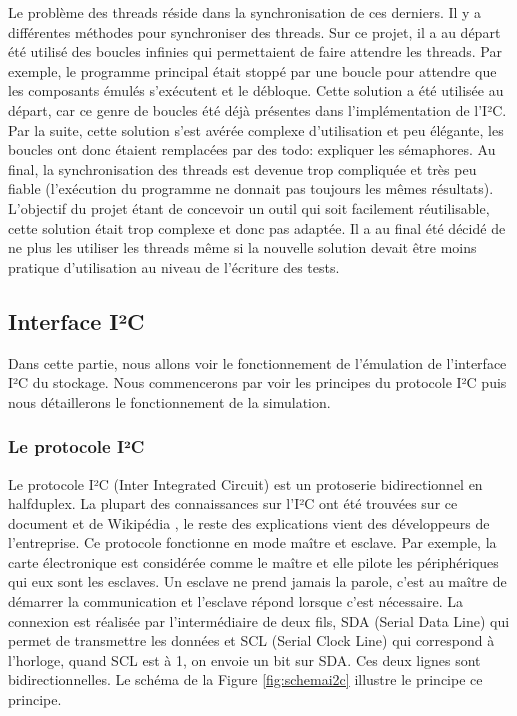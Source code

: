 \documentclass[a4paper]{article}
\begin{document}
Le problème des threads réside dans la synchronisation de ces derniers. Il y a
différentes méthodes pour synchroniser des threads. Sur ce projet, il a au
départ été utilisé des boucles infinies qui permettaient de faire attendre les
threads. Par exemple, le programme principal était stoppé par une boucle pour
attendre que les composants émulés s'exécutent et le débloque. Cette solution a
été utilisée au départ, car ce genre de boucles été déjà présentes dans
l'implémentation de l'I²C. Par la suite, cette solution s'est avérée complexe
d'utilisation et peu élégante, les boucles ont donc étaient remplacées par des %
todo: expliquer les sémaphores. Au final, la synchronisation des threads est
devenue trop compliquée et très peu fiable (l'exécution du programme ne donnait
pas toujours les mêmes résultats). L'objectif du projet étant de concevoir un
outil qui soit facilement réutilisable, cette solution était trop complexe et
donc pas adaptée. Il a au final été décidé de ne plus les utiliser les threads
même si la nouvelle solution devait être moins pratique d'utilisation au niveau
de l'écriture des tests.
\subsection{Interface I²C}%

Dans cette partie, nous allons voir le fonctionnement de l'émulation de
l'interface I²C du stockage. Nous commencerons par voir les principes du
protocole I²C puis nous détaillerons le fonctionnement de la simulation.

\subsubsection*{Le protocole I²C}

Le protocole I²C (Inter Integrated Circuit) est un \gls{protoserie}
bidirectionnel en \gls{halfduplex}. La plupart des connaissances sur l'I²C ont
été trouvées sur ce document \cite{mankar2014review} et de Wikipédia
\cite{frwiki:197726464}, le reste des explications vient des développeurs de
l'entreprise. Ce protocole fonctionne en mode maître et esclave. Par exemple, la
carte électronique est considérée comme le maître et elle pilote les
périphériques qui eux sont les esclaves. Un esclave ne prend jamais la parole,
c'est au maître de démarrer la communication et l'esclave répond lorsque c'est
nécessaire. La connexion est réalisée par l'intermédiaire de deux fils, SDA
(Serial Data Line) qui permet de transmettre les données et SCL (Serial Clock
Line) qui correspond à l'horloge, quand SCL est à 1, on envoie un bit sur SDA.
Ces deux lignes sont bidirectionnelles. Le schéma de la Figure
\ref{fig:schemai2c} illustre le principe ce principe.
\end{document}
